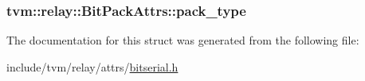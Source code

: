 \subsubsection[{\texorpdfstring{pack\+\_\+type}{pack_type}}]{ tvm\+::relay\+::\+Bit\+Pack\+Attrs\+::pack\+\_\+type}\hypertarget{structtvm_1_1relay_1_1BitPackAttrs_ac913b31a7bad2a800c686238c58373c6}{}\label{structtvm_1_1relay_1_1BitPackAttrs_ac913b31a7bad2a800c686238c58373c6}


The documentation for this struct was generated from the following file\+:\begin{DoxyCompactItemize}
\item 
include/tvm/relay/attrs/\hyperlink{bitserial_8h}{bitserial.\+h}\end{DoxyCompactItemize}
